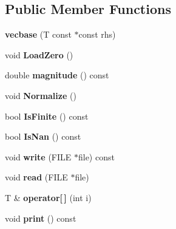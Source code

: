\subsection*{Public Member Functions}
\begin{DoxyCompactItemize}
\item 
\hypertarget{classmath_1_1vecbase_ace789b2c8321e0d058b5cd143df2e439}{
{\bfseries vecbase} (T const $\ast$const rhs)}
\label{classmath_1_1vecbase_ace789b2c8321e0d058b5cd143df2e439}

\item 
\hypertarget{classmath_1_1vecbase_a79960000898a0987a7579fc40fca4bbd}{
void {\bfseries LoadZero} ()}
\label{classmath_1_1vecbase_a79960000898a0987a7579fc40fca4bbd}

\item 
\hypertarget{classmath_1_1vecbase_ac8e12f447b29967af11fb9f830fa08c2}{
double {\bfseries magnitude} () const }
\label{classmath_1_1vecbase_ac8e12f447b29967af11fb9f830fa08c2}

\item 
\hypertarget{classmath_1_1vecbase_ab620e8c531da5d6c86634fcb108646c1}{
void {\bfseries Normalize} ()}
\label{classmath_1_1vecbase_ab620e8c531da5d6c86634fcb108646c1}

\item 
\hypertarget{classmath_1_1vecbase_a7875c870c844f42aeaca952016a04bc7}{
bool {\bfseries IsFinite} () const }
\label{classmath_1_1vecbase_a7875c870c844f42aeaca952016a04bc7}

\item 
\hypertarget{classmath_1_1vecbase_a74f465a86765df211b97c716bc7162dc}{
bool {\bfseries IsNan} () const }
\label{classmath_1_1vecbase_a74f465a86765df211b97c716bc7162dc}

\item 
\hypertarget{classmath_1_1vecbase_a754b07a9163ae8746053ed8ca51e89c6}{
void {\bfseries write} (FILE $\ast$file) const }
\label{classmath_1_1vecbase_a754b07a9163ae8746053ed8ca51e89c6}

\item 
\hypertarget{classmath_1_1vecbase_a9759523e7304173f8ae57f3a9a30b37a}{
void {\bfseries read} (FILE $\ast$file)}
\label{classmath_1_1vecbase_a9759523e7304173f8ae57f3a9a30b37a}

\item 
\hypertarget{classmath_1_1vecbase_a80d2a8df6f5e4a6647531c98eb8fe595}{
T \& {\bfseries operator\mbox{[}$\,$\mbox{]}} (int i)}
\label{classmath_1_1vecbase_a80d2a8df6f5e4a6647531c98eb8fe595}

\item 
\hypertarget{classmath_1_1vecbase_abe9e88db645742e98774a1a946dbaef5}{
void {\bfseries print} () const }
\label{classmath_1_1vecbase_abe9e88db645742e98774a1a946dbaef5}

\end{DoxyCompactItemize}
